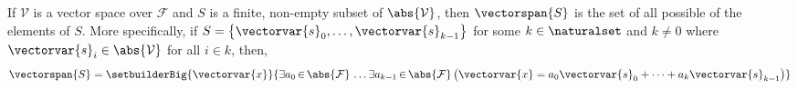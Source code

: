 \begin{thm}
     \label{thm:span-of-finite-set-of-vectors-is-equal-to-the-set-of-all-possible-linear-combinations-of-the-elements-of-the-set}
    If \( \mathcal{V} \) is a vector space over \( \mathcal{F} \) and \( S \) is a finite, non-empty subset of \( \abs{\mathcal{V}} \), then
    \( \vectorspan{S} \) is the set of all possible  of the elements of \( S \).
    More specifically, if \( S = \mleft\{ \vectorvar{s}_{0}, \dots, \vectorvar{s}_{k-1} \mright\} \) for some \( k \in \naturalset \) and \( k \neq 0 \)
    where \( \vectorvar{s}_{i} \in \abs{\mathcal{V}} \) for all \( i \in k \), then,
    \begin{equation*}
        \vectorspan{S} = \setbuilderBig{\vectorvar{x}}{
            \exists a_{0}\,{\in}\,\abs{\mathcal{F}} \, \dots \exists a_{k-1}\,{\in}\,\abs{\mathcal{F}} \,
            \big( \vectorvar{x} = a_{0}\vectorvar{s}_{0} + \cdots + a_{k}\vectorvar{s}_{k-1} \big)
        }
    \end{equation*}
\end{thm}

